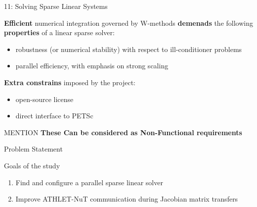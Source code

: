 \ifSpeech
\begin{frame}[t]{11: Solving Sparse Linear Systems}

    \justifying

    \textbf{Efficient} numerical integration governed by W-methods \textbf{demenads} the following \textbf{properties} of a linear sparse solver:
    
    \begin{itemize}
	    \item robustness (or numerical stability) with respect to ill-conditioner problems
    	\item parallel efficiency, with emphasis on strong scaling 
    \end{itemize}
    \spc
    
    
    \textbf{Extra constrains} imposed by the project:
    
    \begin{itemize}
    	\item open-source license
    	\item direct interface to PETSc
    \end{itemize}
    
    \begin{block} {MENTION}
        \textbf{These Can be considered as Non-Functional requirements}    
    \end{block}
    
    
\end{frame}
\fi






\ifSpeech
\begin{frame}{Problem Statement}
    \spc
    \justifying
    
    \begin{block}{Goals of the study}
        \begin{enumerate}
            \setlength\itemsep{0.5cm}
            \item Find and configure a parallel sparse linear solver
            
            \item Improve ATHLET-NuT communication during Jacobian matrix transfers
        \end{enumerate}
    \end{block}

\end{frame}
\fi